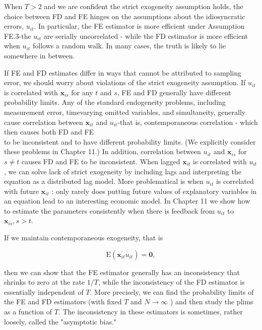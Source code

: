 \documentclass[10pt]{article}
\begin{document}
When $T>2$ and we are confident the strict exogeneity assumption holds, the choice between FD and FE hinges on the assumptions about the idiosyncratic errors, $u_{i t}$. In particular, the FE estimator is more efficient under Assumption FE.3-the $u_{i t}$ are serially uncorrelated - while the FD estimator is more efficient when $u_{i t}$ follows a random walk. In many cases, the truth is likely to lie somewhere in between.

If FE and FD estimates differ in ways that cannot be attributed to sampling error, we should worry about violations of the strict exogeneity assumption. If $u_{i t}$ is correlated with $\mathbf{x}_{i s}$ for any $t$ and $s$, FE and FD generally have different probability limits. Any of the standard endogeneity problems, including measurement error, timevarying omitted variables, and simultaneity, generally cause correlation between $\mathbf{x}_{i t}$ and $u_{i t}$-that is, contemporaneous correlation - which then causes both FD and FE\\
to be inconsistent and to have different probability limits. (We explicitly consider these problems in Chapter 11.) In addition, correlation between $u_{i t}$ and $\mathbf{x}_{i s}$ for $s \neq t$ causes FD and FE to be inconsistent. When lagged $\mathbf{x}_{i t}$ is correlated with $u_{i t}$, we can solve lack of strict exogeneity by including lags and interpreting the equation as a distributed lag model. More problematical is when $u_{i t}$ is correlated with future $\mathbf{x}_{i t}$ : only rarely does putting future values of explanatory variables in an equation lead to an interesting economic model. In Chapter 11 we show how to estimate the parameters consistently when there is feedback from $u_{i t}$ to $\mathbf{x}_{i s}, s>t$.

If we maintain contemporaneous exogeneity, that is


\begin{equation*}
\mathrm{E}\left(\mathbf{x}_{i t}^{\prime} u_{i t}\right)=\mathbf{0}, \tag{10.74}
\end{equation*}


then we can show that the FE estimator generally has an inconsistency that shrinks to zero at the rate $1 / T$, while the inconsistency of the FD estimator is essentially independent of $T$. More precisely, we can find the probability limits of the FE and FD estimators (with fixed $T$ and $N \rightarrow \infty$ ) and then study the plims as a function of $T$. The inconsistency in these estimators is sometimes, rather loosely, called the "asymptotic bias."
\end{document}
